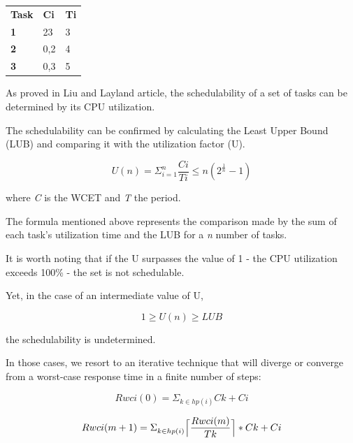 \documentclass[11pt]{article}
\begin{document}
\begin{table}[H]
\begin{tabular}{lll}
\textbf{Task} & \textbf{Ci} & \textbf{Ti} \\
\textbf{1}    & 23         & 3           \\
\textbf{2}    & 0,2         & 4           \\
\textbf{3}    & 0,3         & 5          
\end{tabular}
\end{table}

As proved in Liu and Layland \cite{liulayland} article, the schedulability of a set of tasks can be determined by its CPU utilization.

The schedulability can be confirmed by calculating the Least Upper Bound (LUB) and comparing it with the utilization factor (U).

\begin{equation} 
	U(n) = \Sigma_{i=1}^n \frac{Ci}{Ti} \leq n(2^ \frac{1}{n} - 1)
\end{equation}

{\small where \emph{C} is the WCET and \emph{T} the period.}
\medskip
\medskip

The formula mentioned above represents the comparison made by the sum of each task's utilization time and the LUB for a \emph{n} number of tasks. 

It is worth noting that if the U surpasses the value of 1 - the CPU utilization exceeds 100\% - the set is not schedulable.

Yet, in the case of an intermediate value of U,

\begin{equation} 
	1 \geq U(n) \geq LUB
\end{equation}

the schedulability is undetermined.
\medskip

In those cases, we resort to an iterative technique that will diverge or converge from a worst-case response time in a finite number of steps:

\begin{equation} 
	Rwci(0) = \Sigma_{k\in hp(i)}^{} Ck + Ci
\end{equation}

\begin{equation} \label{lub}
	Rwci(m+1) = \Sigma_{k\in hp(i)}^{}  \Bigl\lceil\dfrac{Rwci(m)}{Tk}\Bigr\rceil * Ck + Ci
\end{equation}
\end{document}
